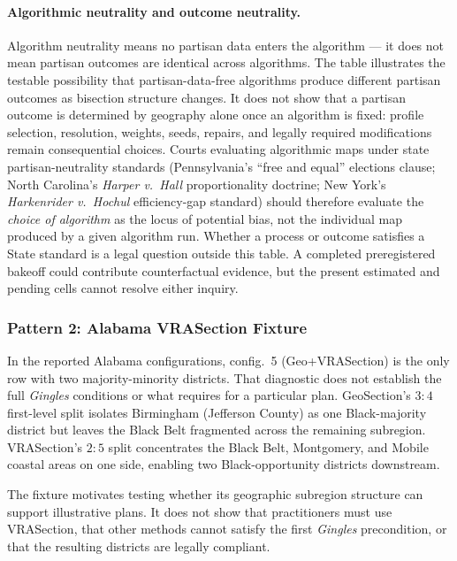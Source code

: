 \paragraph{Algorithmic neutrality and outcome neutrality.}
Algorithm neutrality means no partisan data enters the algorithm --- it does not
mean partisan outcomes are identical across algorithms.
The table illustrates the testable possibility that partisan-data-free
algorithms produce different partisan outcomes as bisection structure changes.
It does not show that a partisan outcome is determined by geography alone once
an algorithm is fixed: profile selection, resolution, weights, seeds, repairs,
and legally required modifications remain consequential choices.
Courts evaluating algorithmic maps under state partisan-neutrality standards
(Pennsylvania's ``free and equal'' elections clause; North Carolina's
\textit{Harper v.\ Hall} proportionality doctrine; New York's
\textit{Harkenrider v.\ Hochul} efficiency-gap standard) should therefore
evaluate the \emph{choice of algorithm} as the locus of potential bias, not
the individual map produced by a given algorithm run.
Whether a process or outcome satisfies a State standard is a legal question
outside this table. A completed preregistered bakeoff could contribute
counterfactual evidence, but the present estimated and pending cells cannot
resolve either inquiry.

\subsubsection*{Pattern 2: Alabama VRASection Fixture}

In the reported Alabama configurations, config.~5 (Geo+VRASection) is the only
row with two majority-minority districts. That diagnostic does not establish
the full \textit{Gingles} conditions or what \allenmilligan{} requires for a
particular plan.
GeoSection's $3:4$ first-level split isolates Birmingham (Jefferson County)
as one Black-majority district but leaves the Black Belt fragmented across the
remaining subregion.
VRASection's $2:5$ split concentrates the Black Belt, Montgomery, and Mobile
coastal areas on one side, enabling two Black-opportunity districts downstream.

The fixture motivates testing whether its geographic subregion structure can
support illustrative plans. It does not show that practitioners must use
VRASection, that other methods cannot satisfy the first \textit{Gingles}
precondition, or that the resulting districts are legally compliant.

